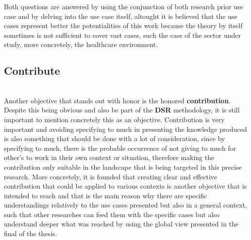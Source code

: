 Both questions are answered by using the conjunction of both research prior use case and by delving into the use case itself, altought it is believed that the use cases represent better the potentialities of this work because the theory by itself sometimes is not sufficient to cover vast cases, such the case of the sector under study, more concretely, the healthcare environment.

\subsection{Contribute}\mbox{}\\
Another objective that stands out with honor is the honored \textbf{contribution}. Despite this being obvious and also be part of the \textbf{DSR} methodology, it is still important to mention concretely this as an objective. Contribution is very important and avoiding specifying to much in presenting the knowledge produced is also something that should be done with a lot of consideration, since by specifying to much, there is the probable occurrence of not giving to much for other's to work in their own context or situation, therefore making the contribution only suitable in the landscape that is being targeted in this precise research. More concretely, it is founded that creating clear and effective contribution that could be applied to various contexts is another objective that is intended to reach and that is the main reason why there are specific understandings relatively to the use cases presented but also in a general context, such that other researches can feed them with the specific cases but also understand deeper what was reached by using the global view presented in the final of the thesis.
